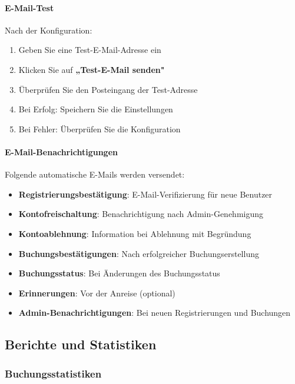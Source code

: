 \paragraph{E-Mail-Test}

Nach der Konfiguration:

\begin{enumerate}
    \item Geben Sie eine Test-E-Mail-Adresse ein
    \item Klicken Sie auf \textbf{„Test-E-Mail senden"}
    \item Überprüfen Sie den Posteingang der Test-Adresse
    \item Bei Erfolg: Speichern Sie die Einstellungen
    \item Bei Fehler: Überprüfen Sie die Konfiguration
\end{enumerate}

\paragraph{E-Mail-Benachrichtigungen}

Folgende automatische E-Mails werden versendet:

\begin{itemize}
    \item \textbf{Registrierungsbestätigung}: E-Mail-Verifizierung für neue Benutzer
    \item \textbf{Kontofreischaltung}: Benachrichtigung nach Admin-Genehmigung
    \item \textbf{Kontoablehnung}: Information bei Ablehnung mit Begründung
    \item \textbf{Buchungsbestätigungen}: Nach erfolgreicher Buchungserstellung
    \item \textbf{Buchungsstatus}: Bei Änderungen des Buchungsstatus
    \item \textbf{Erinnerungen}: Vor der Anreise (optional)
    \item \textbf{Admin-Benachrichtigungen}: Bei neuen Registrierungen und Buchungen
\end{itemize}

\subsection{Berichte und Statistiken}

\subsubsection{Buchungsstatistiken}

